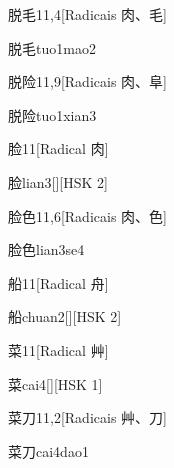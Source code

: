\begin{entry}{脱毛}{11,4}[Radicais ⾁、⽑]
  \begin{phonetics}{脱毛}{tuo1mao2}
  \end{phonetics}
\end{entry}

\begin{entry}{脱险}{11,9}[Radicais ⾁、⾩]
  \begin{phonetics}{脱险}{tuo1xian3}
  \end{phonetics}
\end{entry}

\begin{entry}{脸}{11}[Radical ⾁]
  \begin{phonetics}{脸}{lian3}[][HSK 2]
  \end{phonetics}
\end{entry}

\begin{entry}{脸色}{11,6}[Radicais ⾁、⾊]
  \begin{phonetics}{脸色}{lian3se4}
  \end{phonetics}
\end{entry}

\begin{entry}{船}{11}[Radical ⾈]
  \begin{phonetics}{船}{chuan2}[][HSK 2]
  \end{phonetics}
\end{entry}

\begin{entry}{菜}{11}[Radical ⾋]
  \begin{phonetics}{菜}{cai4}[][HSK 1]
  \end{phonetics}
\end{entry}

\begin{entry}{菜刀}{11,2}[Radicais ⾋、⼑]
  \begin{phonetics}{菜刀}{cai4dao1}
  \end{phonetics}
\end{entry}

